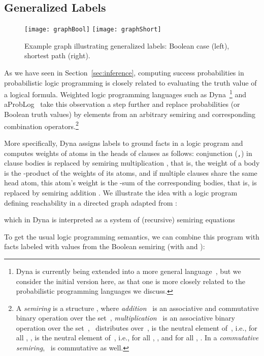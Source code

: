 \documentclass[a4paper]{article}
\begin{document}
\subsection{Generalized Labels}\label{sec:dyna} 
\begin{figure}
\centering
\texttt{[image: graphBool]}\hspace{2cm}
\texttt{[image: graphShort]}
\caption{Example graph illustrating generalized labels: Boolean case (left),
  shortest path (right).}
\label{fig:dyna}
\end{figure} 
As we have seen in Section~\ref{sec:inference}, computing success probabilities in
probabilistic logic programming is closely related to evaluating the
truth value of a logical formula. Weighted logic programming languages such as
Dyna~\citep{Eisner05}\footnote{Dyna is currently being extended into a
  more general language~\citep{eisner-filardo-2011}, but we consider
  the initial version here, as that one is more closely related to
  the probabilistic programming languages we discuss. } and aProbLog~\citep{kimmig:aaai11} take this
observation a step further and replace probabilities (or Boolean
truth values) by elements from an arbitrary semiring and
corresponding combination operators.\footnote{A \emph{semiring} is a structure , where \emph{addition}~ is an associative and commutative binary operation over
the set~, 
\emph{multiplication}~ is an associative binary operation over
the set~, 
~distributes
over~, 
 is the neutral element
of~, i.e., for all , ,
 is the neutral element of~, i.e., for all , ,
and
for all , .  In a \emph{commutative semiring}, ~is
commutative as well.}

More specifically, Dyna assigns labels to ground facts in a logic
program and computes weights of atoms in the heads of clauses as
follows: conjunction (\verb|,|) in clause bodies is replaced by
semiring multiplication , that is, the weight of a body is
the -product of the weights of its atoms, and if multiple
clauses share the same head atom, this atom's weight is the
-sum of the corresponding bodies, that is,  is
replaced by semiring addition . 
We illustrate the idea with a logic program defining reachability in a
directed graph adapted from \cite{cohen:iclp08}:

which in Dyna is interpreted as a system of (recursive) semiring equations

To get the usual logic programming semantics, we can combine this program with facts labeled  with values from
the Boolean semiring (with  and ):
\end{document}
